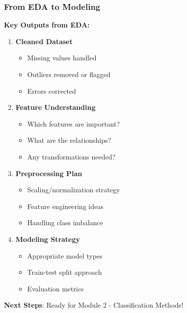 \documentclass[aspectratio=169]{beamer}
\begin{document}
\begin{frame}
\frametitle{From EDA to Modeling}

\textbf{Key Outputs from EDA:}

\begin{enumerate}
    \item \textbf{Cleaned Dataset}
    \begin{itemize}
        \item Missing values handled
        \item Outliers removed or flagged
        \item Errors corrected
    \end{itemize}

    \item \textbf{Feature Understanding}
    \begin{itemize}
        \item Which features are important?
        \item What are the relationships?
        \item Any transformations needed?
    \end{itemize}

    \item \textbf{Preprocessing Plan}
    \begin{itemize}
        \item Scaling/normalization strategy
        \item Feature engineering ideas
        \item Handling class imbalance
    \end{itemize}

    \item \textbf{Modeling Strategy}
    \begin{itemize}
        \item Appropriate model types
        \item Train-test split approach
        \item Evaluation metrics
    \end{itemize}
\end{enumerate}

\vspace{0.3cm}

\textbf{Next Steps}: Ready for Module 2 - Classification Methods!

\end{frame}
\end{document}
